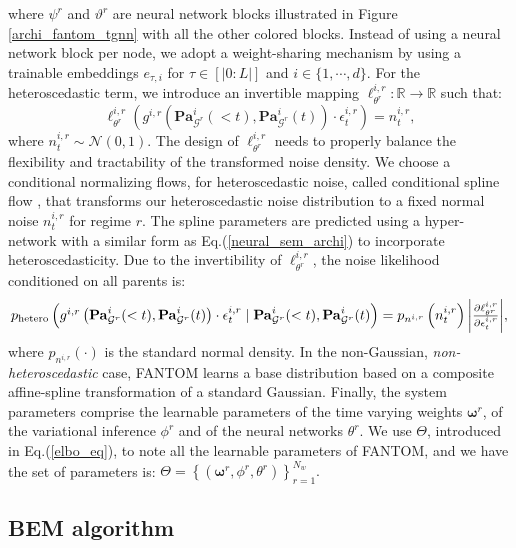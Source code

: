 where $\psi^r$ and $\vartheta^r$ are neural network blocks illustrated in Figure \ref{archi_fantom_tgnn} with all the other colored blocks. Instead of using a neural network block per node, we adopt a weight-sharing mechanism by using a trainable embeddings $e_{\tau,i}$ for $\tau \in [|0:L|]$ and $i \in \{1, \cdots, d\}$. For the heteroscedastic term, we introduce an invertible mapping  $ \ell^{i,r}_{\theta^r}: \mathbb{R} \rightarrow \mathbb{R}$ such that:
$$\ell^{i,r}_{\theta^r} \left(g^{i,r}\left(\mathbf{P a}_{\mathcal{G}^r}^i(<t), \mathbf{P a}_{\mathcal{G}^r}^i(t)\right)\cdot\epsilon_t^{i,r}\right) = n^{i,r}_t,$$ where $n^{i,r}_t \sim \mathcal{N}(0,1)$. The design of $\ell^{i,r}_{\theta^r}$ needs to properly balance the flexibility and tractability of the transformed noise density. We choose a conditional normalizing flows, for heteroscedastic noise, called conditional spline flow \citep{durkan2019neural}, that transforms our heteroscedastic noise distribution to a fixed normal noise $n^{i,r}_t$ for regime $r$. The spline parameters are predicted using a hyper-network with a similar form as Eq.(\ref{neural_sem_archi}) to incorporate heteroscedasticity. Due to the invertibility of $\ell^{i,r}_{\theta^r}$, the noise likelihood conditioned on all parents is:
\begin{equation}
   \scalebox{1}{$p_{\text{hetero}}\left(g^{i,r}\left(\mathbf{P a}_{\mathcal{G}^r}^i(<t), \mathbf{P a}_{\mathcal{G}^r}^i(t)\right)\cdot\epsilon_t^{i,r}\mid \mathbf{P a}_{\mathcal{G}^r}^i(<t), \mathbf{P a}_{\mathcal{G}^r}^i(t)\right)=p_{n^{i,r}}\left(n_t^{i,r}\right)\left|\frac{\partial \ell^{i,r}_{\theta^r}}{\partial \epsilon_t^{i,r}}\right|$} ,
   \label{eq_condtion_NF}
\end{equation}
where \(p_{n^{i,r}}(\cdot)\) is the standard normal density. In the non-Gaussian, \emph{non-heteroscedastic} case, FANTOM learns a base distribution based on a composite affine-spline transformation of a standard Gaussian. Finally, the system parameters comprise the learnable parameters of the time varying weights $ \boldsymbol{\omega}^r$, of the variational inference $\phi^r$ and of the neural networks $\theta^r$. We use $\Theta$, introduced in Eq.(\ref{elbo_eq}), to note all the learnable parameters of FANTOM, and we have the set of parameters is: $
\Theta=\left\{\left(\boldsymbol{\omega}^r, \phi^r, \theta^r\right)\right\}_{r=1}^{N_w} .
$
\subsection{BEM algorithm}
